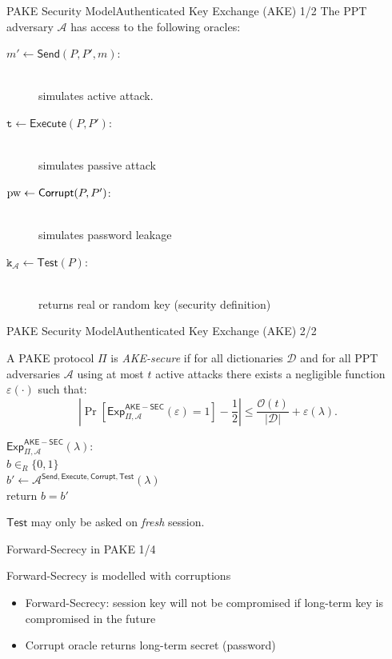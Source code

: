\documentclass[notes,xcolor=dvipsnames]{beamer}
\begin{document}
\begin{frame}{PAKE Security Model}{Authenticated Key Exchange (AKE) 1/2}
The PPT adversary $\mathcal{A}$ has access to the following oracles:
\begin{description}
    \item[$m'\gets\mathsf{Send}(P,P',m)$:] \hfill \\ simulates active attack.
    \item[$\mathtt{t}\gets\mathsf{Execute}(P,P')$:] \hfill \\ simulates passive attack
    \item[$\mathrm{pw}\gets\mathsf{Corrupt}(P, P')$:] \hfill \\ simulates password leakage
    \item[$\mathtt{k}_\mathcal{A}\gets\mathsf{Test}(P)$:] \hfill \\ returns real or random key (security definition)
\end{description}
\end{frame}

\begin{frame}{PAKE Security Model}{Authenticated Key Exchange (AKE) 2/2}
\begin{definition}\label{def:ake}
A PAKE protocol $\Pi$ is \emph{AKE-secure} if for all dictionaries $\mathcal{D}$ and for all PPT adversaries $\mathcal{A}$ using at most $t$ active attacks there exists a negligible function $\varepsilon(\cdot)$ such that:
\[\left|\Pr[\mathsf{Exp}_{\Pi,\mathcal{A}}^{\mathsf{AKE-SEC}}(\varepsilon)=1]-\frac12\right|\leq \frac{\mathcal{O}(t)}{|\mathcal{D}|}+\varepsilon(\lambda).\]

\noindent$\mathsf{Exp}_{\Pi,\mathcal{A}}^{\mathsf{AKE-SEC}}(\lambda):$ \\
\hspace*{2em} $b\in_R\{0,1\}$\\
\hspace*{2em} $b'\gets\mathcal{A}^{\mathsf{Send},\mathsf{Execute},\mathsf{Corrupt},\mathsf{Test}}(\lambda)$\\
\hspace*{2em} return $b=b'$
\end{definition}
$\mathsf{Test}$ may only be asked on \emph{fresh} session.
\end{frame}


\begin{frame}{Forward-Secrecy in PAKE 1/4}{}

	Forward-Secrecy is modelled with corruptions
	\begin{itemize}
		\item Forward-Secrecy: session key will not be compromised if long-term key is compromised in the future
		\item Corrupt oracle returns long-term secret (password)
	\end{itemize}

\end{frame}
\end{document}
